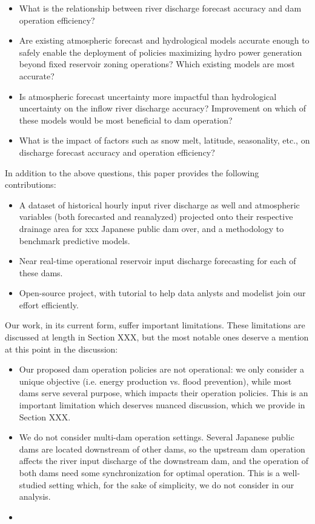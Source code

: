 \documentclass{article}
\begin{document}
\begin{itemize}
  \item What is the relationship between river discharge forecast accuracy and dam operation efficiency?
	\item Are existing atmospheric forecast and hydrological models accurate enough to
	safely enable the deployment of policies maximizing hydro
	power generation beyond fixed reservoir zoning operations?
	Which existing models are most accurate?
	\item Is atmospheric forecast uncertainty more impactful
	than hydrological uncertainty on the inflow river discharge accuracy?
	Improvement on which of these models would be most beneficial to dam operation?
	\item What is the impact of factors such as snow melt, latitude, seasonality, etc.,
	on discharge forecast accuracy and operation efficiency?
\end{itemize}

In addition to the above questions, this paper provides the following contributions:

\begin{itemize}
	\item A dataset of historical hourly input river discharge as well and
	atmospheric variables (both forecasted and reanalyzed) projected onto their
	respective drainage area for xxx Japanese public dam over,
	and a methodology to benchmark predictive models.
	\item Near real-time operational reservoir input discharge forecasting for
	each of these dams.
	\item Open-source project, with tutorial to help data anlysts and modelist join our effort efficiently.
\end{itemize}

Our work, in its current form, suffer important limitations.
These limitations are discussed at length in Section XXX,
but the most notable ones deserve a mention at this point in the discussion:

\begin{itemize}
	\item Our proposed dam operation policies are not operational:
	we only consider a unique objective (i.e. energy production vs. flood prevention),
	while most dams serve several purpose, which impacts their operation policies.
	This is an important limitation which deserves nuanced discussion,
	which we provide in Section XXX.
	\item We do not consider multi-dam operation settings.
	Several Japanese public dams are located downstream of other dams,
	so the upstream dam operation affects the river input discharge of the downstream dam,
	and the operation of both dams need some synchronization for optimal operation.
	This is a well-studied setting \cite{} which, for the sake of simplicity,
	we do not consider in our analysis.
	\item
\end{itemize}
\end{document}
